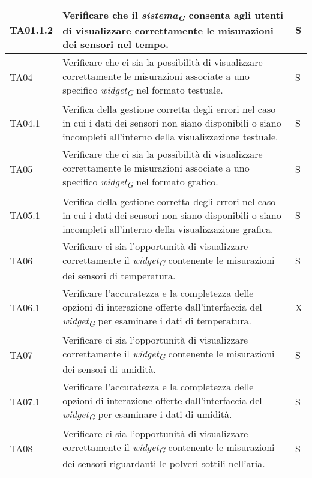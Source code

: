 \begin{longtable}{|C{1.9cm}|L{5cm}|C{2cm}|}
    TA01.1.2 & Verificare che il \textit{sistema}\textsubscript{\textit{G}} consenta agli utenti di visualizzare correttamente le misurazioni dei sensori nel tempo. & S \\
    \hline
    
    TA04 & Verificare che ci sia la possibilità di visualizzare correttamente le misurazioni associate a uno specifico \textit{widget}\textsubscript{\textit{G}} nel formato testuale.  & S \\
    \hline
    
    TA04.1 & Verifica della gestione corretta degli errori nel caso in cui i dati dei sensori non siano disponibili o siano incompleti all'interno della visualizzazione testuale. & S \\
    \hline
    
    TA05 & Verificare che ci sia la possibilità di visualizzare correttamente le misurazioni associate a uno specifico \textit{widget}\textsubscript{\textit{G}} nel formato grafico. & S \\
    \hline
    
    TA05.1 & Verifica della gestione corretta degli errori nel caso in cui i dati dei sensori non siano disponibili o siano incompleti all'interno della visualizzazione grafica. & S \\
    \hline
    
    TA06 & Verificare ci sia l'opportunità di visualizzare correttamente il \textit{widget}\textsubscript{\textit{G}} contenente le misurazioni dei sensori di temperatura. & S \\
    \hline
    
    TA06.1 & Verificare l'accuratezza e la completezza delle opzioni di interazione offerte dall'interfaccia del \textit{widget}\textsubscript{\textit{G}} per esaminare i dati di temperatura. & X \\
    \hline
    
    TA07 & Verificare ci sia l'opportunità di visualizzare correttamente il \textit{widget}\textsubscript{\textit{G}} contenente le misurazioni dei sensori di umidità. & S \\
    \hline
    
    TA07.1 & Verificare l'accuratezza e la completezza delle opzioni di interazione offerte dall'interfaccia del \textit{widget}\textsubscript{\textit{G}} per esaminare i dati di umidità. & S \\
    \hline
    
    TA08 & Verificare ci sia l'opportunità di visualizzare correttamente il \textit{widget}\textsubscript{\textit{G}} contenente le misurazioni dei sensori riguardanti le polveri sottili nell'aria. & S \\
    \hline
    

\end{longtable}
